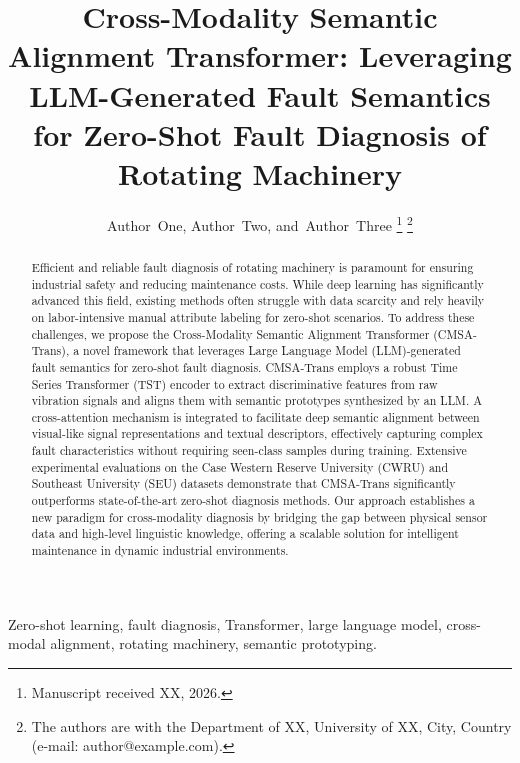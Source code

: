 \documentclass[journal]{IEEEtran}
\begin{document}
\title{Cross-Modality Semantic Alignment Transformer: Leveraging LLM-Generated Fault Semantics for Zero-Shot Fault Diagnosis of Rotating Machinery}

\author{Author~One,
        Author~Two,
        and~Author~Three
\thanks{Manuscript received XX, 2026.}
\thanks{The authors are with the Department of XX, University of XX, City, Country (e-mail: author@example.com).}}


\maketitle

\begin{abstract}
Efficient and reliable fault diagnosis of rotating machinery is paramount for ensuring industrial safety and reducing maintenance costs. While deep learning has significantly advanced this field, existing methods often struggle with data scarcity and rely heavily on labor-intensive manual attribute labeling for zero-shot scenarios. To address these challenges, we propose the Cross-Modality Semantic Alignment Transformer (CMSA-Trans), a novel framework that leverages Large Language Model (LLM)-generated fault semantics for zero-shot fault diagnosis. CMSA-Trans employs a robust Time Series Transformer (TST) encoder to extract discriminative features from raw vibration signals and aligns them with semantic prototypes synthesized by an LLM. A cross-attention mechanism is integrated to facilitate deep semantic alignment between visual-like signal representations and textual descriptors, effectively capturing complex fault characteristics without requiring seen-class samples during training. Extensive experimental evaluations on the Case Western Reserve University (CWRU) and Southeast University (SEU) datasets demonstrate that CMSA-Trans significantly outperforms state-of-the-art zero-shot diagnosis methods. Our approach establishes a new paradigm for cross-modality diagnosis by bridging the gap between physical sensor data and high-level linguistic knowledge, offering a scalable solution for intelligent maintenance in dynamic industrial environments.
\end{abstract}

\begin{IEEEkeywords}
Zero-shot learning, fault diagnosis, Transformer, large language model, cross-modal alignment, rotating machinery, semantic prototyping.
\end{IEEEkeywords}
\end{document}
